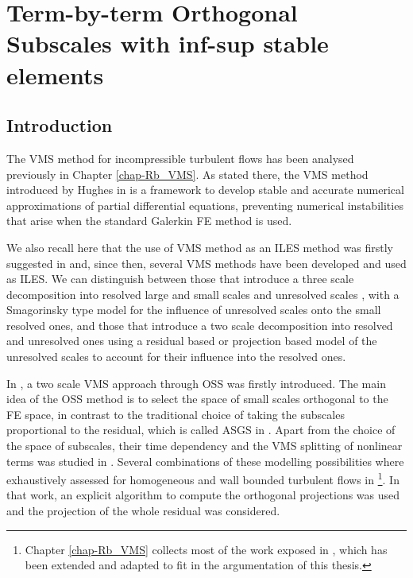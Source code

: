\chapter{Term-by-term Orthogonal Subscales with inf-sup stable elements}
\label{chap-TBT_OSS}

\section{Introduction}
\label{sec-C5_intro}

The VMS method for incompressible turbulent flows has been analysed previously in Chapter \ref{chap-Rb_VMS}. As stated there, the VMS method introduced by Hughes in \cite{hughes_multiscale_1995,hughes_variational_1998} is a framework to develop stable and accurate numerical approximations of partial differential equations, preventing numerical instabilities that arise when the standard Galerkin FE method is used. 

We also recall here that the use of VMS method as an ILES method was firstly suggested in \cite{hughes_multiscale_2001,hughes_large_2001,codina_stabilized_2002} and, since then, several VMS methods have been developed and used as ILES. We can distinguish between those that introduce a three scale decomposition into resolved large and small scales and unresolved scales \cite{koobus_variational_2004,john_variants_2008, john_numerical_2010, masud_variational_2011}, with a Smagorinsky type model for the influence of unresolved scales onto the small resolved ones, and those that introduce a two scale decomposition into resolved and unresolved ones \cite{bazilevs_variational_2007,colomes_assessment_2015} using a residual based or projection based model of the unresolved scales to account for their influence into the resolved ones.

In \cite{codina_stabilization_2000}, a two scale VMS approach through OSS was firstly introduced. The main idea of the OSS method is to select the space of small scales orthogonal to the FE space, in contrast to the traditional choice of taking the subscales proportional to the residual, which is called ASGS in \cite{codina_stabilization_2000}. Apart from the choice of the space of subscales, their time dependency and the VMS splitting of nonlinear terms was studied in \cite{codina_time_2007}. Several combinations of these modelling possibilities where exhaustively assessed for homogeneous and wall bounded turbulent flows in \cite{colomes_assessment_2015}\footnote{Chapter \ref{chap-Rb_VMS} collects most of the work exposed in \cite{colomes_assessment_2015}, which has been extended and adapted to fit in the argumentation of this thesis.}. In that work, an explicit algorithm to compute the orthogonal projections was used and the projection of the whole residual was considered.

